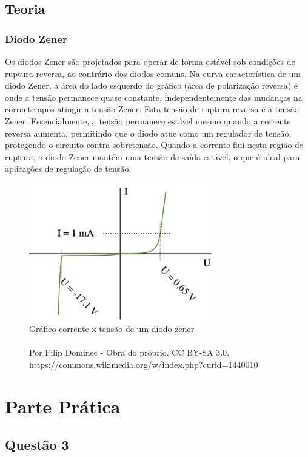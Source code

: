 \documentclass{article}
\begin{document}
\subsection{Teoria}
\subsubsection{Diodo Zener}
\label{zener}

Os diodos Zener são projetados para operar de forma estável sob condições de ruptura reversa, ao contrário dos diodos comuns. Na curva característica de um diodo Zener, a área do lado esquerdo do gráfico (área de polarização reversa) é onde a tensão permanece quase constante, independentemente das mudanças na corrente após atingir a tensão Zener. Esta tensão de ruptura reversa é a tensão Zener. Essencialmente, a tensão permanece estável mesmo quando a corrente reversa aumenta, permitindo que o diodo atue como um regulador de tensão, protegendo o circuito contra sobretensão. Quando a corrente flui nesta região de ruptura, o diodo Zener mantém uma tensão de saída estável, o que é ideal para aplicações de regulação de tensão.

\begin{figure}[h!]
    \centering
    \includegraphics[width=8cm]{images/diodo-zener.png}
    \caption{
        Gráfico corrente x tensão de um diodo zener \\ \\
        \tiny
        Por Filip Dominec - Obra do próprio, CC BY-SA 3.0, https://commons.wikimedia.org/w/index.php?curid=1440010
    }
\end{figure}

\section{Parte Prática}

\subsection{Questão 3}
\end{document}
